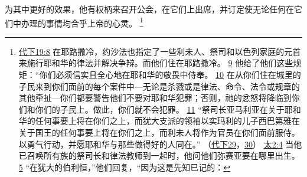 \documentclass[12pt, a4paper, oneside]{ctexart}
\begin{document}
	为其中更好的效果，他有权柄来召开公会，在它们上出席，并订定使无论任何在它们中办理的事情均合乎上帝的心灵。
	\footnote {
		\href{https://biblehub.com/2_chronicles/19-8.htm}{代下19:8} 在耶路撒冷，约沙法也指定了一些利未人、祭司和以色列家庭的元首来施行耶和华的律法并解决争辩。而他们住在耶路撒冷。
		\href{https://biblehub.com/2_chronicles/19-9.htm}{9} 他给了他们这些规矩：“你们必须信实且全心地在耶和华的敬畏中侍奉。
		\href{https://biblehub.com/2_chronicles/19-10.htm}{10} 在从你们住在城里的子民来到你们面前的每个案件中---无论是杀戮或是律法、命令、法令或规章的其他牵扯---你们都要警告他们不要对耶和华犯罪；否则，祂的忿怒将降临到你们和你们的子民上。做此，你们就不会犯罪。
		\href{https://biblehub.com/2_chronicles/19-11.htm}{11} “祭司长亚马利亚在关于耶和华的任何事要上将在你们之上，而犹大支派的领袖以实玛利的儿子西巴第雅在关于国王的任何事要上将在你们之上，而利未人将作为官员在你们面前服侍。以勇气行动，并愿耶和华与那些做得好的人同在。”
		（\href{https://biblehub.com/niv/2_chronicles/29.htm}{代下29}，\href{https://biblehub.com/niv/2_chronicles/30.htm}{30}） 
		\href{https://biblehub.com/matthew/2-4.htm}{太2:4} 当他已召唤所有族的祭司长和律法教师到一起时，他问他们弥赛亚要在哪里出生。
		\href{https://biblehub.com/matthew/2-5.htm}{5} “在犹大的伯利恒，”他们回复，“因为这是先知已记的：
	}
\end{document}
